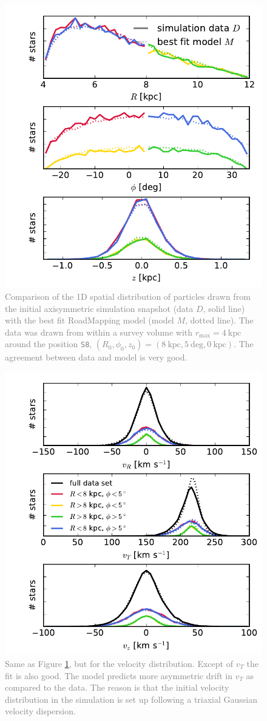 \documentclass[10pt,a4paper]{article}
\newcommand{\Answer}[1]{\textcolor{Gray}{#1}}
\begin{document}
\begin{figure}[!htbp]
\centering
\includegraphics[width=0.7\columnwidth]{fig/MNdHHinit_4kpc8Spiral_a_test1_data_bestfit_residuals_3b.pdf}
\caption{\Answer{Comparison of the 1D spatial distribution of particles drawn from the initial axisymmetric simulation snapshot (data $D$, solid line) with the best fit RoadMapping model (model $M$, dotted line). The data was drawn from within a survey volume with $r_\text{max}=4~\text{kpc}$ around the position \texttt{S8}, $(R_0,\phi_0,z_0)=(8~\text{kpc},5~\text{deg},0~\text{kpc})$. The agreement between data and model is very good.}}
\label{fig:MNinit_spatial}
\end{figure}

\begin{figure}[!htbp]
\centering
\includegraphics[width=0.7\columnwidth]{fig/MNdHHinit_4kpc8Spiral_a_test1_data_bestfit_residuals_3c.pdf}
\caption{\Answer{Same as Figure \ref{fig:MNinit_spatial}, but for the velocity distribution. Except of $v_T$ the fit is also good. The model predicts more asymmetric drift in $v_T$ as compared to the data. The reason is that the initial velocity distribution in the simulation is set up following a triaxial Gaussian velocity dispersion.}}
\end{figure}
\end{document}
